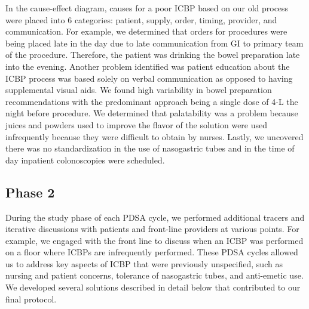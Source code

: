 \documentclass[Bprep]{subfiles}
\begin{document}
In the cause-effect diagram, causes for a poor ICBP based on our old process were placed into 6 categories: patient, supply, order, timing, provider, and communication. For example, we determined that orders for procedures were being placed late in the day due to late communication from GI to primary team of the procedure. Therefore, the patient was drinking the bowel preparation late into the evening. Another
problem identified was patient education about the ICBP process was based solely on verbal communication as opposed to having supplemental visual aids. We found high variability in bowel preparation recommendations with the predominant approach being a single dose of 4-L the night before procedure. We determined that palatability was a problem because juices and powders used to improve the flavor of the solution were used infrequently because they were difficult to obtain by nurses. Lastly, we uncovered there was no standardization in the use of nasogastric tubes and in the time of day inpatient colonoscopies were scheduled.\\



\subsection{Phase 2}\label{subsec:ResPhase2}
\hypertarget{Phase 2}{}

During the study phase of each PDSA cycle, we performed additional tracers and iterative discussions with patients and front-line providers at various points. For example, we engaged with the front line to discuss when an ICBP was performed on a floor where ICBPs are infrequently performed. These PDSA cycles allowed us to address key aspects of ICBP that were previously unspecified, such as nursing and patient concerns, tolerance of nasogastric tubes, and anti-emetic use. We developed several solutions described in detail below that contributed to our final protocol.\\
\end{document}
